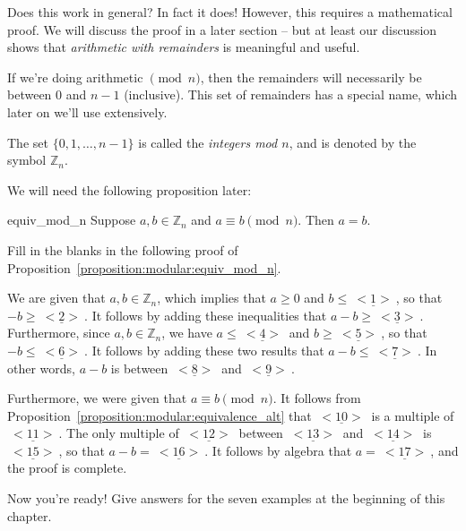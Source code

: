 Does this work in general? In fact it does! However, this requires a mathematical proof.  We will discuss the proof in a later section -- but at least our discussion shows that \emph{arithmetic with remainders} is meaningful and useful.

If we're doing arithmetic $\pmod{n}$, then the remainders will necessarily be between $0$ and $n-1$ (inclusive). This set of  remainders has a special name, which later on we'll use extensively.

\begin{defn}\label{integers_mod_n}
The set $\{0,1,\ldots,n-1\}$ is called the \emph{integers mod $n$}, and is denoted by the symbol ${\mathbb Z}_n$.
\end{defn}

We will need the following proposition later:

\begin{prop}{equiv_mod_n}
Suppose $a,b \in  {\mathbb Z}_n$ and $a \equiv b \pmod{n}$. Then $a = b$.
\end{prop}

\begin{exercise}{27} 
Fill in the blanks in the following proof of Proposition~\ref{proposition:modular:equiv_mod_n}.

\noindent
We are given that $a,b \in  {\mathbb Z}_n$, which implies that $a \geq 0$ and $b \leq  \underline{~<1>~}$, so that $-b \geq  \underline{~<2>~}$.
It follows by adding these inequalities that $a - b \geq   \underline{~<3>~}$. 
Furthermore, since $a,b \in  {\mathbb Z}_n$, we have $a \leq \underline{~<4>~}$ and $b \geq  \underline{~<5>~}$, so that $-b \leq  \underline{~<6>~}$.
It follows by adding these two results that $a - b \leq  \underline{~<7>~}$. In other words,  $a - b$ is between $\underline{~<8>~}$ and $\underline{~<9>~}$. 

Furthermore, we were given that $a \equiv b \pmod{n}$. It follows from Proposition~\ref{proposition:modular:equivalence_alt} that $\underline{~<10>~}$ is  a multiple of $\underline{~<11>~}$. 
The only multiple of $\underline{~<12>~}$ between $\underline{~<13>~}$ and $\underline{~<14>~}$ is $\underline{~<15>~}$, so that $a - b = \underline{~<16>~}$. It follows by algebra that $a = \underline{~<17>~}$, and the proof is complete.
\end{exercise}


\begin{exercise}{28}
Now you're ready! Give answers for the seven examples at the beginning of this chapter.
\end{exercise}

